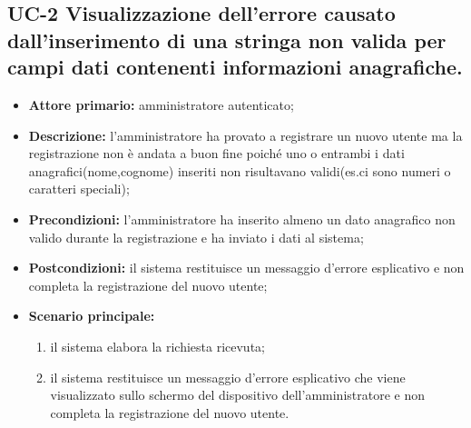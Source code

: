 \subsection{UC-2 Visualizzazione dell'errore causato dall'inserimento di una stringa non valida per campi dati contenenti informazioni anagrafiche.}
\begin{itemize}
	\item \textbf{Attore primario:} amministratore autenticato;

	\item \textbf{Descrizione:} l'amministratore ha provato a registrare un nuovo utente ma la registrazione non è andata a buon fine poiché uno o entrambi i dati anagrafici(nome,cognome) inseriti non risultavano validi(es.ci sono numeri o caratteri speciali);

	\item \textbf{Precondizioni:} l'amministratore ha inserito almeno un dato anagrafico non valido durante la registrazione e ha inviato i dati al sistema;

	\item \textbf{Postcondizioni:} il sistema restituisce un messaggio d'errore esplicativo e non completa la registrazione del nuovo utente;

	\item \textbf{Scenario principale:}
		\begin{enumerate}
    		\item il sistema elabora la richiesta ricevuta;
    		\item il sistema restituisce un messaggio d'errore esplicativo che viene visualizzato sullo schermo del dispositivo dell'amministratore e non completa la registrazione del nuovo utente.
		\end{enumerate}
\end{itemize}

